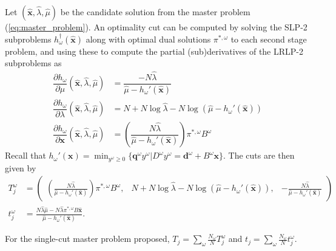 \documentclass[11pt]{article}
\newcommand{\x}{\mathbf{x}}
\newcommand{\xh}{\hat{\x}}
\newcommand{\lh}{\hat{\lambda}}
\newcommand{\mh}{\hat{\mu}}
\newcommand{\q}{\mathbf{q}}
\renewcommand{\d}{\mathbf{d}}
\begin{document}
Let $(\xh,\lh,\mh)$ be the candidate solution from the master problem (\ref{eq:master_problem}).  An optimality cut can be computed by solving the SLP-2 subproblems $h^\dagger_\omega(\xh)$ along with optimal dual solutions $\pi^{*,\omega}$ to each second stage problem, and using these to compute the partial (sub)derivatives of the LRLP-2 subproblems as
\begin{align*}
	\dfrac{\partial h_\omega}{\partial \mu}(\xh,\lh,\mh) & = \dfrac{-N\lh}{\mh - h_\omega'(\xh)} \\
	\dfrac{\partial h_\omega}{\partial \lambda}(\xh,\lh,\mh) & = N + N\log\lh - N \log(\mh - h_\omega'(\xh)) \\
	\dfrac{\partial h_\omega}{\partial \x}(\xh,\lh,\mh) & = \left(\dfrac{N\lh}{\mh - h_\omega'(\xh)}\right) \pi^{*,\omega} B^\omega
\end{align*}
Recall that $h_\omega'(\x) = \min_{y^\omega \geq 0} \{\q^\omega y^\omega | D^\omega y^\omega = \d^\omega + B^\omega \x\}$.  The cuts are then given by
\begin{align*}
	T_j^\omega & = 
	\left( \begin{array}{ccc}
		\left(\frac{N\lh}{\mh - h_\omega'(\xh)}\right) \pi^{*,\omega} B^\omega, 
			 & N + N\log\lh - N\log(\mh - h_\omega'(\xh)), 
			 & -\frac{N\lh}{\mh - h_\omega'(\xh)}
	\end{array} \right) \\
	t_j^\omega & = \frac{N \lh \mh - N \lh \pi^{*,\omega}B\xh}{\mh - h_\omega'(\xh)}.
\end{align*}

For the single-cut master problem proposed, $T_j = \sum_\omega \frac{N_\omega}{N} T_j^\omega$ and $t_j = \sum_\omega \frac{N_\omega}{N} t_j^\omega$.
\end{document}

